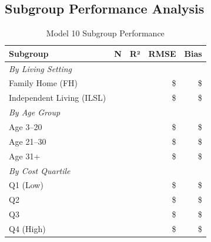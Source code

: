 \subsection{Subgroup Performance Analysis}

\begin{table}[h]
\centering
\caption{Model 10 Subgroup Performance}
\begin{tabular}{lrrrr}
\toprule
\textbf{Subgroup} & \textbf{N} & \textbf{R²} & \textbf{RMSE} & \textbf{Bias} \\
\midrule
\multicolumn{5}{l}{\textit{By Living Setting}} \\
Family Home (FH) & \ModelTenSubgrouplivingFHN{} & \ModelTenSubgrouplivingFHRSquared{} & \$\ModelTenSubgrouplivingFHRMSE{} & \$\ModelTenSubgrouplivingFHBias{} \\
Independent Living (ILSL) & \ModelTenSubgrouplivingILSLN{} & \ModelTenSubgrouplivingILSLRSquared{} & \$\ModelTenSubgrouplivingILSLRMSE{} & \$\ModelTenSubgrouplivingILSLBias{} \\
\midrule
\multicolumn{5}{l}{\textit{By Age Group}} \\
Age 3--20 & \ModelTenSubgroupageAgeUnderTwentyOneN{} & \ModelTenSubgroupageAgeUnderTwentyOneRSquared{} & \$\ModelTenSubgroupageAgeUnderTwentyOneRMSE{} & \$\ModelTenSubgroupageAgeUnderTwentyOneBias{} \\
Age 21--30 & \ModelTenSubgroupageAgeTwentyOneToThirtyN{} & \ModelTenSubgroupageAgeTwentyOneToThirtyRSquared{} & \$\ModelTenSubgroupageAgeTwentyOneToThirtyRMSE{} & \$\ModelTenSubgroupageAgeTwentyOneToThirtyBias{} \\
Age 31+ & \ModelTenSubgroupageAgeThirtyOnePlusN{} & \ModelTenSubgroupageAgeThirtyOnePlusRSquared{} & \$\ModelTenSubgroupageAgeThirtyOnePlusRMSE{} & \$\ModelTenSubgroupageAgeThirtyOnePlusBias{} \\
\midrule
\multicolumn{5}{l}{\textit{By Cost Quartile}} \\
Q1 (Low) & \ModelTenSubgroupcostQOneLowN{} & \ModelTenSubgroupcostQOneLowRSquared{} & \$\ModelTenSubgroupcostQOneLowRMSE{} & \$\ModelTenSubgroupcostQOneLowBias{} \\
Q2 & \ModelTenSubgroupcostQTwoN{} & \ModelTenSubgroupcostQTwoRSquared{} & \$\ModelTenSubgroupcostQTwoRMSE{} & \$\ModelTenSubgroupcostQTwoBias{} \\
Q3 & \ModelTenSubgroupcostQThreeN{} & \ModelTenSubgroupcostQThreeRSquared{} & \$\ModelTenSubgroupcostQThreeRMSE{} & \$\ModelTenSubgroupcostQThreeBias{} \\
Q4 (High) & \ModelTenSubgroupcostQFourHighN{} & \ModelTenSubgroupcostQFourHighRSquared{} & \$\ModelTenSubgroupcostQFourHighRMSE{} & \$\ModelTenSubgroupcostQFourHighBias{} \\
\bottomrule
\end{tabular}
\end{table}

